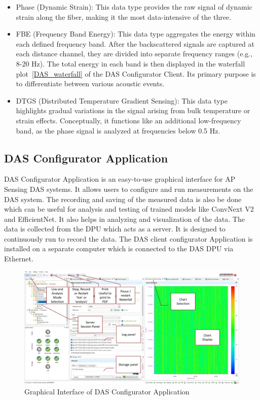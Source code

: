 \begin{itemize} 
    \item{Phase (Dynamic Strain):} 
    This data type provides the raw signal of dynamic strain along the fiber, making it the most data-intensive of the three.

    \item{FBE (Frequency Band Energy):} 
    This data type aggregates the energy within each defined frequency band. After the backscattered signals are captured at each distance channel, they are divided into separate frequency ranges (e.g., 8-20 Hz). The total energy in each band is then displayed in the waterfall plot~\ref{DAS_waterfall} of the DAS Configurator Client. Its primary purpose is to differentiate between various acoustic events.

    \item{DTGS (Distributed Temperature Gradient Sensing):} 
    This data type highlights gradual variations in the signal arising from bulk temperature or strain effects. Conceptually, it functions like an additional low-frequency band, as the phase signal is analyzed at frequencies below 0.5 Hz.
\end{itemize}


\subsection{DAS Configurator Application}\label{sec:config_app}
DAS Configurator Application is an easy-to-use graphical interface for AP Sensing DAS systems. It allows users to configure and run measurements on the DAS system. The recording and saving of the measured data is also be done which can be useful for analysis and testing of trained models like ConvNext V2 and EfficientNet. It also helps in analyzing and visualization of the data. The data is collected from the DPU which acts as a server. It is designed to continuously run to record the data. The DAS client configurator Application is installed on a separate computer which is connected to the DAS DPU via Ethernet. 

\begin{figure}[h]
    \centering
    \includegraphics[width=\linewidth]{Bilder/jpg/DAS_config.jpg}
    \caption{Graphical Interface of DAS Configurator Application~\cite{DAS_Configurator_Manual}}
    \label{config}
\end{figure}

